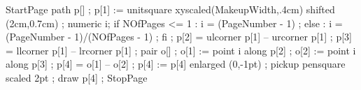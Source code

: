 StartPage
path p[] ;
p[1] := unitsquare xyscaled(MakeupWidth,.4cm) shifted (2cm,0.7cm) ;
numeric i; 
if NOfPages <= 1 :
  i = (PageNumber - 1) ;
else :
  i = (PageNumber - 1)/(NOfPages - 1) ;
fi ;
p[2] = ulcorner p[1] -- urcorner p[1] ;
p[3] = llcorner p[1] -- lrcorner p[1] ;
pair o[] ;
o[1] := point i along p[2] ;
o[2] := point i along p[3] ;
p[4] = o[1] -- o[2] ;
p[4] := p[4] enlarged (0,-1pt) ;
pickup pensquare scaled 2pt ;
draw p[4] ;
StopPage
\stopuseMPgraphic







\setupSlideTitle
   [\c!after=,
    \c!alternative=layer,
    \c!width=\textwidth,
    \c!align=\v!center,
    \c!height=1.5cm]


\setupitemize[1][inmargin]

\protect
\stopmodule

\endinput

